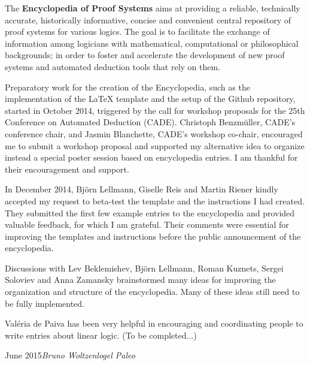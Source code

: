 
\preface

The \textbf{Encyclopedia of Proof Systems} aims at providing a reliable, technically accurate, historically informative, concise and convenient central repository of proof systems for various logics. The goal is to facilitate the exchange of information among logicians with mathematical, computational or philosophical backgrounds; in order to foster and accelerate the development of new proof systems and automated deduction tools that rely on them.

Preparatory work for the creation of the Encyclopedia, such as the implementation of the LaTeX template and the setup of the Github repository, started in October 2014, triggered by the call for workshop proposals for the 25th Conference on Automated Deduction (CADE). Christoph Benzm\"uller, CADE's conference chair, and Jasmin Blanchette, CADE's workshop co-chair, encouraged me to submit a workshop proposal and supported my alternative idea to organize instead a special poster session based on encyclopedia entries. I am thankful for their encouragement and support.

In December 2014, Bj\"orn Lellmann, Giselle Reis and Martin Riener kindly accepted my request to beta-test the template and the instructions I had created. They submitted the first few example entries to the encyclopedia and provided valuable feedback, for which I am grateful. Their comments were essential for improving the templates and instructions before the public announcement of the encyclopedia.

Discussions with Lev Beklemishev, Bj\"orn Lellmann, Roman Kuznets, Sergei Soloviev and Anna Zamansky brainstormed many ideas for improving the organization and structure of the encyclopedia. Many of these ideas still need to be fully implemented.

Val\'{e}ria de Paiva has been very helpful in encouraging and coordinating people to write entries about linear logic. (To be completed...)

\vspace{\baselineskip}
\begin{flushright}\noindent
June 2015\hfill {\it Bruno Woltzenlogel Paleo}
\end{flushright}


